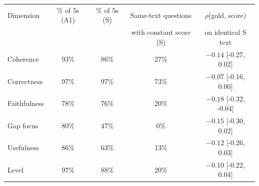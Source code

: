 \begin{tabular}{lcccc}
\toprule
Dimension & \% of 5s (A1) & \% of 5s (S) & Same-text questions & $\rho$(gold, score) \\
 & & & with constant score (S) & on identical S text \\
\midrule
Coherence & 93\% & 86\% & 27\% & $-0.14$ [-0.27, 0.02] \\
Correctness & 97\% & 97\% & 73\% & $-0.07$ [-0.16, 0.00] \\
Faithfulness & 78\% & 76\% & 20\% & $-0.18$ [-0.32, -0.04] \\
Gap focus & 80\% & 47\% & 0\% & $-0.15$ [-0.30, 0.02] \\
Usefulness & 86\% & 63\% & 13\% & $-0.12$ [-0.26, 0.03] \\
Level & 97\% & 88\% & 20\% & $-0.10$ [-0.22, 0.04] \\
\bottomrule
\end{tabular}